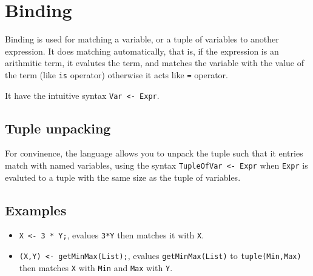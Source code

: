 \section{Binding}

Binding is used for matching a variable, or a tuple of variables to
another expression. It does matching automatically, that is, if the
expression is an arithmitic term, it evalutes the term, and
matches the variable with the value of the term (like \texttt{is}
operator) otherwise it acts like \texttt{=} operator.

It have the intuitive syntax \texttt{Var <- Expr}. 

\subsection{Tuple unpacking}

For convinence, the language allows you to unpack the tuple such that it
entries match with named variables, using the syntax \texttt{TupleOfVar <-
Expr} when \texttt{Expr} is evaluted to a tuple with the same size as the tuple
of variables.

\subsection{Examples}

\begin{itemize}
	\item \texttt{X <- 3 * Y;}, evalues \texttt{3*Y} then matches it with \texttt{X}.
	\item \texttt{(X,Y) <- getMinMax(List);}, evalues \texttt{getMinMax(List)} to \texttt{tuple(Min,Max)} then
	      matches \texttt{X} with \texttt{Min} and \texttt{Max} with \texttt{Y}.
\end{itemize}

